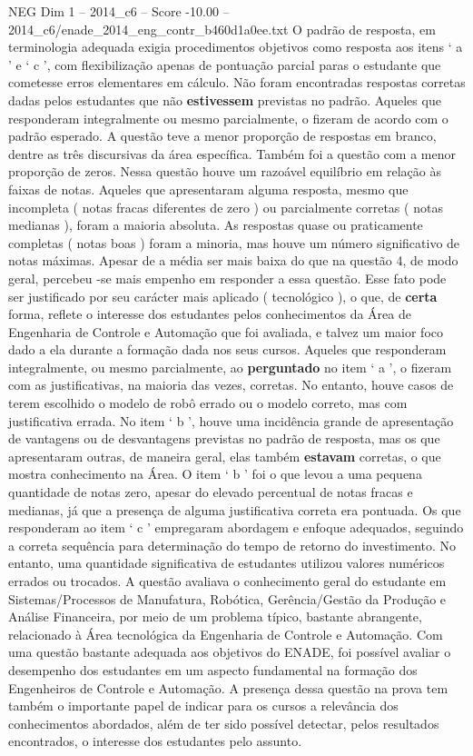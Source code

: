 \begin{textsample}{NEG Dim 1 – 2014\_c6 – Score -10.00 – 2014\_c6/enade\_2014\_eng\_contr\_b460d1a0ee.txt}
O padrão de resposta, em terminologia adequada exigia procedimentos objetivos como resposta aos itens ‘ a ’ e ‘ c ’, com flexibilização apenas de pontuação parcial paras o estudante que cometesse erros elementares em cálculo.
Não foram encontradas respostas corretas dadas pelos estudantes que não \textbf{estivessem} previstas no padrão.
Aqueles que responderam integralmente ou mesmo parcialmente, o fizeram de acordo com o padrão esperado.
A questão teve a menor proporção de respostas em branco, dentre as três discursivas da área específica.
Também foi a questão com a menor proporção de zeros.
Nessa questão houve um razoável equilíbrio em relação às faixas de notas.
Aqueles que apresentaram alguma resposta, mesmo que incompleta ( notas fracas diferentes de zero ) ou parcialmente corretas ( notas medianas ), foram a maioria absoluta.
As respostas quase ou praticamente completas ( notas boas ) foram a minoria, mas houve um número significativo de notas máximas.
Apesar de a média ser mais baixa do que na questão 4, de modo geral, percebeu -se mais empenho em responder a essa questão.
Esse fato pode ser justificado por seu carácter mais aplicado ( tecnológico ), o que, de \textbf{certa} forma, reflete o interesse dos estudantes pelos conhecimentos da Área de Engenharia de Controle e Automação que foi avaliada, e talvez um maior foco dado a ela durante a formação dada nos seus cursos.
Aqueles que responderam integralmente, ou mesmo parcialmente, ao \textbf{perguntado} no item ‘ a ’, o fizeram com as justificativas, na maioria das vezes, corretas.
No entanto, houve casos de terem escolhido o modelo de robô errado ou o modelo correto, mas com justificativa errada.
No item ‘ b ’, houve uma incidência grande de apresentação de vantagens ou de desvantagens previstas no padrão de resposta, mas os que apresentaram outras, de maneira geral, elas também \textbf{estavam} corretas, o que mostra conhecimento na Área.
O item ‘ b ’ foi o que levou a uma pequena quantidade de notas zero, apesar do elevado percentual de notas fracas e medianas, já que a presença de alguma justificativa correta era pontuada.
Os que responderam ao item ‘ c ’ empregaram abordagem e enfoque adequados, seguindo a correta sequência para determinação do tempo de retorno do investimento.
No entanto, uma quantidade significativa de estudantes utilizou valores numéricos errados ou trocados.
A questão avaliava o conhecimento geral do estudante em Sistemas/Processos de Manufatura, Robótica, Gerência/Gestão da Produção e Análise Financeira, por meio de um problema típico, bastante abrangente, relacionado à Área tecnológica da Engenharia de Controle e Automação.
Com uma questão bastante adequada aos objetivos do ENADE, foi possível avaliar o desempenho dos estudantes em um aspecto fundamental na formação dos Engenheiros de Controle e Automação.
A presença dessa questão na prova tem também o importante papel de indicar para os cursos a relevância dos conhecimentos abordados, além de ter sido possível detectar, pelos resultados encontrados, o interesse dos estudantes pelo assunto.

\end{textsample}
